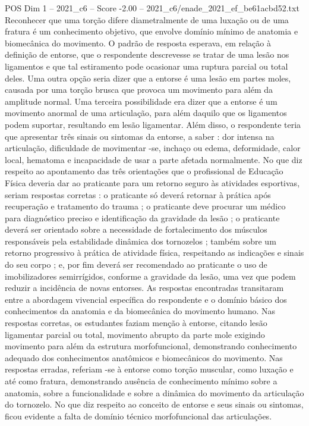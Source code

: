 \begin{textsample}{POS Dim 1 – 2021\_c6 – Score -2.00 – 2021\_c6/enade\_2021\_ef\_be61acbd52.txt}
Reconhecer que uma torção difere diametralmente de uma luxação ou de uma fratura é um conhecimento objetivo, que envolve domínio mínimo de anatomia e biomecânica do movimento.
O padrão de resposta esperava, em relação à definição de entorse, que o respondente descrevesse se tratar de uma lesão nos ligamentos e que tal estiramento pode ocasionar uma ruptura parcial ou total deles.
Uma outra opção seria dizer que a entorse é uma lesão em partes moles, causada por uma torção brusca que provoca um movimento para além da amplitude normal.
Uma terceira possibilidade era dizer que a entorse é um movimento anormal de uma articulação, para além daquilo que os ligamentos podem suportar, resultando em lesão ligamentar.
Além disso, o respondente teria que apresentar três sinais ou sintomas da entorse, a saber : dor intensa na articulação, dificuldade de movimentar -se, inchaço ou edema, deformidade, calor local, hematoma e incapacidade de usar a parte afetada normalmente.
No que diz respeito ao apontamento das três orientações que o profissional de Educação Física deveria dar ao praticante para um retorno seguro às atividades esportivas, seriam respostas corretas : o praticante só deverá retornar à prática após recuperação e tratamento do trauma ; o praticante deve procurar um médico para diagnóstico preciso e identificação da gravidade da lesão ; o praticante deverá ser orientado sobre a necessidade de fortalecimento dos músculos responsáveis pela estabilidade dinâmica dos tornozelos ; também sobre um retorno progressivo à prática de atividade física, respeitando as indicações e sinais do seu corpo ; e, por fim deverá ser recomendado ao praticante o uso de imobilizadores semirrígidos, conforme a gravidade da lesão, uma vez que podem reduzir a incidência de novas entorses.
As respostas encontradas transitaram entre a abordagem vivencial específica do respondente e o domínio básico dos conhecimentos da anatomia e da biomecânica do movimento humano.
Nas respostas corretas, os estudantes faziam menção à entorse, citando lesão ligamentar parcial ou total, movimento abrupto da parte mole exigindo movimento para além da estrutura morfofuncional, demonstrando conhecimento adequado dos conhecimentos anatômicos e biomecânicos do movimento.
Nas respostas erradas, referiam -se à entorse como torção muscular, como luxação e até como fratura, demonstrando ausência de conhecimento mínimo sobre a anatomia, sobre a funcionalidade e sobre a dinâmica do movimento da articulação do tornozelo.
No que diz respeito ao conceito de entorse e seus sinais ou sintomas, ficou evidente a falta de domínio técnico morfofuncional das articulações.

\end{textsample}

